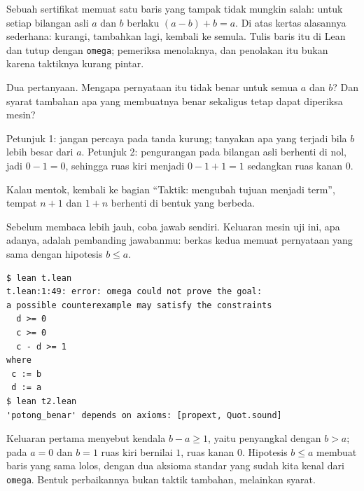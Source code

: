 \begin{tantangan}
Sebuah sertifikat memuat satu baris yang tampak tidak mungkin salah: untuk setiap bilangan asli $a$
dan $b$ berlaku $(a-b)+b=a$. Di atas kertas alasannya sederhana: kurangi, tambahkan lagi, kembali ke
semula. Tulis baris itu di Lean dan tutup dengan \texttt{omega}; pemeriksa menolaknya, dan penolakan
itu bukan karena taktiknya kurang pintar.

Dua pertanyaan. Mengapa pernyataan itu tidak benar untuk semua $a$ dan $b$? Dan syarat tambahan apa
yang membuatnya benar sekaligus tetap dapat diperiksa mesin?

Petunjuk 1: jangan percaya pada tanda kurung; tanyakan apa yang terjadi bila $b$ lebih besar dari
$a$. Petunjuk 2: pengurangan pada bilangan asli berhenti di nol, jadi $0-1=0$, sehingga ruas kiri
menjadi $0-1+1=1$ sedangkan ruas kanan $0$.

Kalau mentok, kembali ke bagian ``Taktik: mengubah tujuan menjadi term'', tempat $n+1$ dan $1+n$
berhenti di bentuk yang berbeda.
\end{tantangan}

Sebelum membaca lebih jauh, coba jawab sendiri. Keluaran mesin uji ini, apa adanya, adalah pembanding
jawabanmu: berkas kedua memuat pernyataan yang sama dengan hipotesis $b\le a$.

\begin{verbatim}
$ lean t.lean
t.lean:1:49: error: omega could not prove the goal:
a possible counterexample may satisfy the constraints
  d >= 0
  c >= 0
  c - d >= 1
where
 c := b
 d := a
$ lean t2.lean
'potong_benar' depends on axioms: [propext, Quot.sound]
\end{verbatim}

Keluaran pertama menyebut kendala $b-a\ge 1$, yaitu penyangkal dengan $b>a$; pada $a=0$ dan $b=1$
ruas kiri bernilai $1$, ruas kanan $0$. Hipotesis $b\le a$ membuat baris yang sama lolos, dengan dua
aksioma standar yang sudah kita kenal dari \texttt{omega}. Bentuk perbaikannya bukan taktik
tambahan, melainkan syarat.


